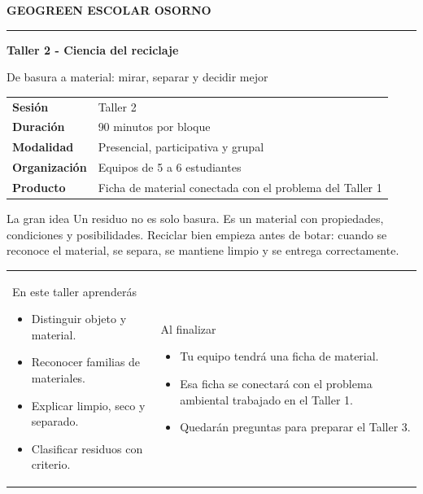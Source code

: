 \documentclass[10pt,a4paper]{article}
\newcommand{\eyebrow}[1]{%
  {\small\bfseries\textcolor{AIEPRed}{\MakeUppercase{#1}}}\par
  \vspace{7mm}
  {\color{AIEPRed}\rule{18mm}{0.8pt}}\par
  \vspace{9mm}
}
\begin{document}
\RaggedRight

\eyebrow{GeoGreen Escolar Osorno}

{\Huge\bfseries\color{AIEPNavy}Taller 2 - Ciencia del reciclaje\par}
\vspace{3mm}
{\Large\color{AIEPMuted}De basura a material: mirar, separar y decidir mejor\par}

\vspace{9mm}
\begin{tabular}{@{}>{\bfseries\color{AIEPNavy}}l@{\hspace{7mm}}l@{}}
Sesión & Taller 2 \\
Duración & 90 minutos por bloque \\
Modalidad & Presencial, participativa y grupal \\
Organización & Equipos de 5 a 6 estudiantes \\
Producto & Ficha de material conectada con el problema del Taller 1 \\
\end{tabular}

\vspace{8mm}
\begin{keybox}{La gran idea}
Un residuo no es solo basura. Es un material con propiedades, condiciones y posibilidades. Reciclar bien empieza antes de botar: cuando se reconoce el material, se separa, se mantiene limpio y se entrega correctamente.
\end{keybox}

\begin{tabularx}{\textwidth}{@{}Y Y@{}}
\begin{infobox}[height=35mm]{En este taller aprenderás}
\begin{itemize}
  \item Distinguir objeto y material.
  \item Reconocer familias de materiales.
  \item Explicar limpio, seco y separado.
  \item Clasificar residuos con criterio.
\end{itemize}
\end{infobox}
&
\begin{infobox}[height=35mm]{Al finalizar}
\begin{itemize}
  \item Tu equipo tendrá una ficha de material.
  \item Esa ficha se conectará con el problema ambiental trabajado en el Taller 1.
  \item Quedarán preguntas para preparar el Taller 3.
\end{itemize}
\end{infobox}
\end{tabularx}
\end{document}
